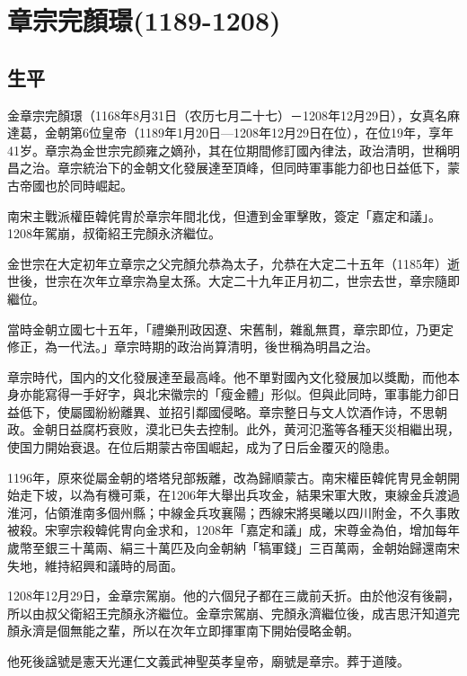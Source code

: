 
\section{章宗完顏璟\tiny(1189-1208)}

\subsection{生平}

金章宗完顏璟（1168年8月31日（农历七月二十七）－1208年12月29日），女真名麻達葛，金朝第6位皇帝（1189年1月20日—1208年12月29日在位），在位19年，享年41岁。章宗為金世宗完颜雍之嫡孙，其在位期間修訂國內律法，政治清明，世稱明昌之治。章宗統治下的金朝文化發展達至頂峰，但同時軍事能力卻也日益低下，蒙古帝國也於同時崛起。

南宋主戰派權臣韓侂胄於章宗年間北伐，但遭到金軍擊敗，簽定「嘉定和議」。1208年駕崩，叔衛紹王完顏永济繼位。

金世宗在大定初年立章宗之父完顏允恭為太子，允恭在大定二十五年（1185年）逝世後，世宗在次年立章宗為皇太孫。大定二十九年正月初二，世宗去世，章宗隨即繼位。

當時金朝立國七十五年，「禮樂刑政因遼、宋舊制，雜亂無貫，章宗即位，乃更定修正，為一代法。」章宗時期的政治尚算清明，後世稱為明昌之治。

章宗時代，国内的文化發展達至最高峰。他不單對國內文化發展加以獎勵，而他本身亦能寫得一手好字，與北宋徽宗的「瘦金體」形似。但與此同時，軍事能力卻日益低下，使屬國紛紛離異、並招引鄰國侵略。章宗整日与文人饮酒作诗，不思朝政。金朝日益腐朽衰败，漠北已失去控制。此外，黄河氾濫等各種天災相繼出現，使国力開始衰退。在位后期蒙古帝国崛起，成为了日后金覆灭的隐患。

1196年，原來從屬金朝的塔塔兒部叛離，改為歸順蒙古。南宋權臣韓侂冑見金朝開始走下坡，以為有機可乘，在1206年大舉出兵攻金，結果宋軍大敗，東線金兵渡過淮河，佔領淮南多個州縣；中線金兵攻襄陽；西線宋將吳曦以四川附金，不久事敗被殺。宋寧宗殺韓侂冑向金求和，1208年「嘉定和議」成，宋尊金為伯，增加每年歲幣至銀三十萬兩、絹三十萬匹及向金朝納「犒軍錢」三百萬兩，金朝始歸還南宋失地，維持紹興和議時的局面。

1208年12月29日，金章宗駕崩。他的六個兒子都在三歲前夭折。由於他沒有後嗣，所以由叔父衛紹王完顏永济繼位。金章宗駕崩、完顏永濟繼位後，成吉思汗知道完顏永濟是個無能之輩，所以在次年立即揮軍南下開始侵略金朝。

他死後諡號是憲天光運仁文義武神聖英孝皇帝，廟號是章宗。葬于道陵。

